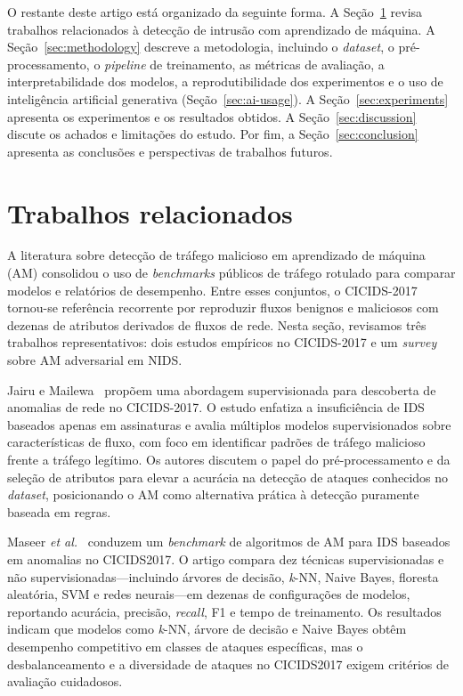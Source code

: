 \documentclass[12pt]{article}
\makeatletter
\newlength{\sbcblockmargin}
\newenvironment{sbcnarrowblock}{%
  \list{}{%
    \topsep\z@
    \partopsep\z@
    \itemsep\z@
    \parsep\z@
    \leftmargin=\sbcblockmargin
    \rightmargin=\sbcblockmargin
    \listparindent=\parindent
    \itemindent=\z@
    \labelwidth=\z@
    \labelsep=\z@
  }\item\relax}
{\endlist}
\makeatother
\begin{document}
\begin{sbcnarrowblock}
O restante deste artigo está organizado da seguinte forma.
A Seção~\ref{sec:related} revisa trabalhos relacionados à detecção de intrusão com aprendizado de máquina.
A Seção~\ref{sec:methodology} descreve a metodologia, incluindo o \textit{dataset}, o pré-processamento, o \textit{pipeline} de treinamento, as métricas de avaliação, a interpretabilidade dos modelos, a reprodutibilidade dos experimentos e o uso de inteligência artificial generativa (Seção~\ref{sec:ai-usage}).
A Seção~\ref{sec:experiments} apresenta os experimentos e os resultados obtidos.
A Seção~\ref{sec:discussion} discute os achados e limitações do estudo.
Por fim, a Seção~\ref{sec:conclusion} apresenta as conclusões e perspectivas de trabalhos futuros.

\section{Trabalhos relacionados}
\label{sec:related}

A literatura sobre detecção de tráfego malicioso em aprendizado de máquina (AM) consolidou o uso de \textit{benchmarks} públicos de tráfego rotulado para comparar modelos e relatórios de desempenho.
Entre esses conjuntos, o CICIDS-2017~\cite{sharafaldin2018toward} tornou-se referência recorrente por reproduzir fluxos benignos e maliciosos com dezenas de atributos derivados de fluxos de rede.
Nesta seção, revisamos três trabalhos representativos: dois estudos empíricos no CICIDS-2017 e um \textit{survey} sobre AM adversarial em NIDS.

Jairu e Mailewa~\cite{jairu2022network} propõem uma abordagem supervisionada para descoberta de anomalias de rede no CICIDS-2017.
O estudo enfatiza a insuficiência de IDS baseados apenas em assinaturas e avalia múltiplos modelos supervisionados sobre características de fluxo, com foco em identificar padrões de tráfego malicioso frente a tráfego legítimo.
Os autores discutem o papel do pré-processamento e da seleção de atributos para elevar a acurácia na detecção de ataques conhecidos no \textit{dataset}, posicionando o AM como alternativa prática à detecção puramente baseada em regras.

Maseer \textit{et al.}~\cite{maseer2021benchmarking} conduzem um \textit{benchmark} de algoritmos de AM para IDS baseados em anomalias no CICIDS2017.
O artigo compara dez técnicas supervisionadas e não supervisionadas---incluindo árvores de decisão, \textit{k}-NN, Naive Bayes, floresta aleatória, SVM e redes neurais---em dezenas de configurações de modelos, reportando acurácia, precisão, \textit{recall}, F1 e tempo de treinamento.
Os resultados indicam que modelos como \textit{k}-NN, árvore de decisão e Naive Bayes obtêm desempenho competitivo em classes de ataques específicas, mas o desbalanceamento e a diversidade de ataques no CICIDS2017 exigem critérios de avaliação cuidadosos.


\end{sbcnarrowblock}
\end{document}

